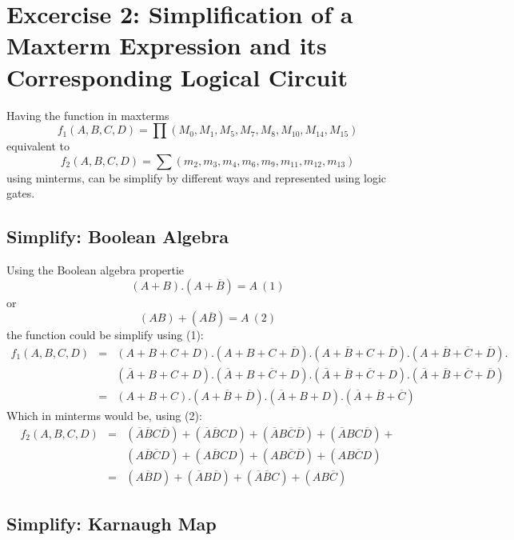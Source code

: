 \section{\color{olive}Excercise 2: Simplification of a Maxterm Expression and its Corresponding Logical Circuit}

Having the function in maxterms $$f_1 (A,B,C,D) = \prod\left(M_0, M_1 , M_5 , M_7 , M_8 , M_{10} , M_{14} , M_{15} \right)$$ equivalent to $$f_2 (A,B,C,D) = \sum\left(m_2, m_3 , m_4 , m_6 , m_9 , m_{11} , m_{12} , m_{13} \right)$$ using minterms, can be simplify by different ways and represented using logic gates.

    \subsection{\color{purple}Simplify: Boolean Algebra}

    Using the Boolean algebra propertie $$(A+B).(A+\overline{B})=A~(1)$$ or $$(AB)+(A\overline{B})=A~(2)$$ the function could be simplify using (1): 
    \begin{eqnarray*}
        f_1 (A,B,C,D) &= &(A+B+C+D).(A+B+C+\overline{D}).(A+\overline{B}+C+\overline{D}).(A+\overline{B}+\overline{C}+\overline{D}).\\
        &&(\overline{A}+B+C+D).(\overline{A}+B+\overline{C}+D).(\overline{A}+\overline{B}+\overline{C}+D).(\overline{A}+\overline{B}+\overline{C}+\overline{D}) \\
        &=&(A+B+C).(A+\overline{B}+\overline{D}).(\overline{A}+B+D).(\overline{A}+\overline{B}+\overline{C})
    \end{eqnarray*}
    Which in minterms would be, using (2):
    \begin{eqnarray*}
        f_2(A,B,C,D) &= &(\overline{A}\overline{B}C\overline{D})+(\overline{A}\overline{B}CD)+(\overline{A}B\overline{C}\overline{D})+(\overline{A}BC\overline{D})+\\
        &&(A\overline{B}\overline{C}D)+(A\overline{B}CD)+(AB\overline{C}\overline{D})+(AB\overline{C}D)\\
        &=&(A\overline{B}D)+(\overline{A}B\overline{D})+(\overline{A}\overline{B}C)+(AB\overline{C})
    \end{eqnarray*}

    \subsection{\color{purple}Simplify: Karnaugh Map}

